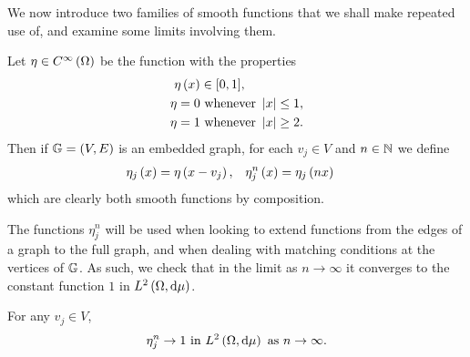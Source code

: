 We now introduce two families of smooth functions that we shall make repeated use of, and examine some limits involving them.
\begin{definition} \label{def:etaDef}
	Let $\eta\in C^{\infty}\left( \Omega \right)$ be the function with the properties
	\begin{align*}
		\eta\left( x \right) &\in [0,1], \\
		\eta = 0 &\text{ whenever } \left\lvert x \right\rvert\leq 1, \\
		\eta = 1 &\text{ whenever } \left\lvert x \right\rvert\geq 2.
	\end{align*}
	Then if $\mathbb{G}=\left( V,E \right)$ is an embedded graph, for each $v_j\in V$ and $n\in\mathbb{N}$ we define
	\begin{align}
		\eta_j\left( x \right) = \eta\left( x-v_j \right), &\quad \eta_j^n\left( x \right) = \eta_j\left( nx \right)
	\end{align}
	which are clearly both smooth functions by composition.
\end{definition}
The functions $\eta_j^n$ will be used when looking to extend functions from the edges of a graph to the full graph, and when dealing with matching conditions at the vertices of $\mathbb{G}$.
As such, we check that in the limit as $n\rightarrow\infty$ it converges to the constant function $1$ in $L^{2}\left( \Omega,\mathrm{d}\mu \right)$.
\begin{lemma} \label{lem:etaConv}
	For any $v_j\in V$, 
	\begin{align*}
		\eta_j^n \rightarrow 1 \text{ in } L^{2}\left( \Omega,\mathrm{d}\mu \right) \ \text{as} \ n \rightarrow\infty.
	\end{align*}
\end{lemma}
